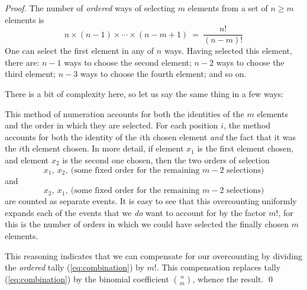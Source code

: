 \begin{proof}
The number of {\em ordered} ways of selecting $m$ elements from a set of $n \geq m$ elements is 
\begin{equation}
\label{eq:combination}
n \times (n-1) \times \cdots \times (n-m+1) \ = \ \frac{n!}{(n-m)!}
\end{equation}
One can select the first element in any of $n$ ways.  Having selected this element, there are: $n-1$ ways to choose the second element; $n-2$ ways to choose the third element; $n-3$ ways to choose the fourth element; and so on.

\smallskip

There is a bit of complexity here, so let us say the same thing in a few ways:

\noindent
This method of numeration accounts for both the identities of the $m$ elements and the order in which they are selected.  For each position $i$, the method accounts for both the identity of the $i$th chosen element {\em and} the fact that it was the $i$th element chosen.  In more detail, if element $x_1$ is the first element chosen, and element $x_2$ is the second one chosen, then the two orders of selection
\[ x_1, \ x_2, \ \mbox{(some fixed order for the remaining $m-2$ selections)} \]
and 
\[ x_2, \ x_1, \ \mbox{(some fixed order for the remaining $m-2$ selections)} \]
are counted as separate events.  It is easy to see that this overcounting uniformly expands each of the events that we {\em do} want to account for by the factor $m!$, for this is the number of orders in which we could have selected the finally chosen $m$ elements.

\smallskip

This reasoning indicates that we can compensate for our overcounting by dividing the {\em ordered} tally (\ref{eq:combination}) by $m!$.  This compensation replaces tally (\ref{eq:combination}) by the binomial coefficient $\displaystyle {n \choose m}$, whence the result.  \qed
\end{proof}

\bigskip

\noindent {}

